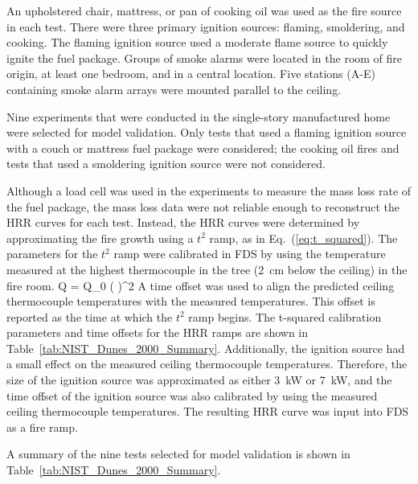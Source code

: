 An upholstered chair, mattress, or pan of cooking oil was used as the fire source in each test.
There were three primary ignition sources: flaming, smoldering, and cooking.
The flaming ignition source used a moderate flame source to quickly ignite the fuel package.
Groups of smoke alarms were located in the room of fire origin, at least one bedroom, and
in a central location. Five stations (A-E) containing smoke alarm arrays were mounted parallel to the ceiling.

Nine experiments that were conducted in the single-story manufactured home were selected for model validation.
Only tests that used a flaming ignition source with a couch or mattress fuel package were considered;
the cooking oil fires and tests that used a smoldering ignition source were not considered.

Although a load cell was used in the experiments to measure the mass loss rate of the fuel package, the mass loss data
were not reliable enough to reconstruct the HRR curves for each test. Instead, the HRR curves were determined by approximating
the fire growth using a $t^2$ ramp, as in Eq.~(\ref{eq:t_squared}). The parameters for the $t^2$ ramp were calibrated in FDS
by using the temperature measured at the highest thermocouple in the tree (2~cm below the ceiling) in the fire room.
\be
\dot Q = \dot Q_0 \left(  \right)^2
\label{eq:t_squared}
\ee
A time offset was used to align the predicted ceiling thermocouple temperatures with the measured temperatures.
This offset is reported as the time at which the $t^2$ ramp begins.
The t-squared calibration parameters and time offsets for the HRR ramps are shown in Table~\ref{tab:NIST_Dunes_2000_Summary}.
Additionally, the ignition source had a small effect on the measured ceiling thermocouple temperatures. Therefore,
the size of the ignition source was approximated as either 3~kW or 7~kW, and the time offset of the ignition source was
also calibrated by using the measured ceiling thermocouple temperatures.
The resulting HRR curve was input into FDS as a fire ramp.

A summary of the nine tests selected for model validation is shown in Table~\ref{tab:NIST_Dunes_2000_Summary}.

